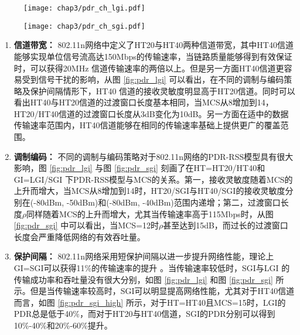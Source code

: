 \begin{figure}[!htp]
\centering
    \texttt{[image: chap3/pdr\_ch\_lgi.pdf]}
\end{figure}

\begin{figure}[!htp]
\centering
    \texttt{[image: chap3/pdr\_ch\_sgi.pdf]}
\end{figure}

\begin{enumerate}
  \item \textbf{信道带宽：}
  802.11n网络中定义了HT20与HT40两种信道带宽，其中HT40信道能够实现单位信号流高达150Mbps的传输速率，当链路质量能够得到有效保证时，可以获得20MHz 信道传输速率的两倍以上。但是另一方面HT40信道更容易受到信号干扰的影响，从图 \ref{fig:pdr_lgi} 可以看出，在不同的调制与编码策略及保护间隔情形下，HT40 信道的接收灵敏度明显高于HT20信道。同时可以看出HT40与HT20信道的过渡窗口长度基本相同，当MCS从8增加到14，HT20/HT40信道的过渡窗口长度从3dB变化为10dB。另一方面在适中的数据传输速率范围内，HT40信道能够在相同的传输速率基础上提供更广的覆盖范围。
  \item \textbf{调制编码：}
  不同的调制与编码策略对于802.11n网络的PDR-RSS模型具有很大影响，图 \ref{fig:pdr_lgi} 与图 \ref{fig:pdr_sgi} 刻画了在HT=HT20/HT40和GI=LGI/SGI 下PDR-RSS模型与MCS的关系。第一，接收灵敏度随着MCS的上升而增大，当MCS从8增加到14时，HT20/SGI与HT40/SGI的接收灵敏度分别在(-80dBm, -50dBm)和(-80dBm, -40dBm)范围内递增；第二，过渡窗口长度$\rho$同样随着MCS的上升而增大，尤其当传输速率高于115Mbps时，从图 \ref{fig:pdr_sgi} 中可以看出，当MCS=12时$\rho$甚至达到15dB，而过长的过渡窗口长度会严重降低网络的有效吞吐量。
  \item \textbf{保护间隔：}
  802.11n网络采用短保护间隔以进一步提升网络性能，理论上GI=SGI可以获得11\%的传输速率的提升 。当传输速率较低时，SGI与LGI 的传输成功率和吞吐量没有很大分别，如图 \ref{fig:pdr_lgi} 和图 \ref{fig:pdr_sgi} 所示。但是当传输速率较高时，SGI可以明显提高网络性能，尤其对于HT40信道而言，如图 \ref{fig:pdr_sgi_high} 所示，对于HT=HT40且MCS=15时，LGI的PDR总是低于40\%，而对于HT20与HT40信道，SGI的PDR分别可以得到10\%-40\%和20\%-60\%提升。
\end{enumerate}

